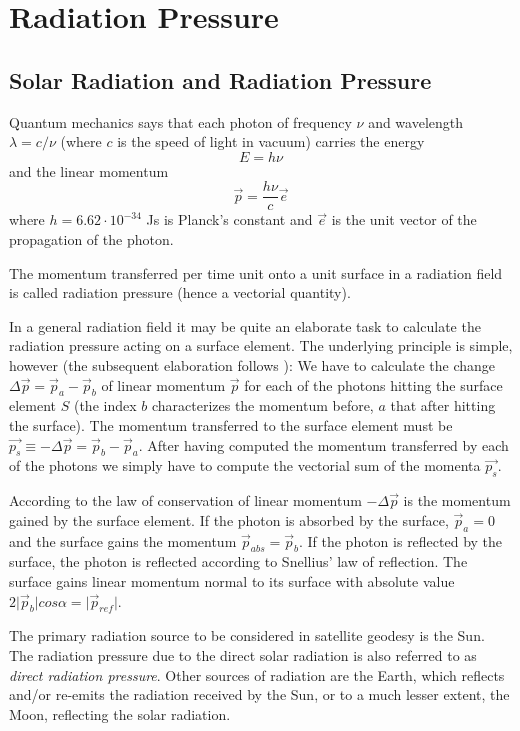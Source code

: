 \section{Radiation Pressure}
\subsection{Solar Radiation and Radiation Pressure}
Quantum mechanics says that each photon of frequency \(\nu\) and wavelength
\(\lambda = c / \nu\) (where \(c\) is the speed of light in vacuum) carries the energy
\begin{equation}
    E = h \nu
\end{equation}
and the linear momentum
\begin{equation}
    \vec{p} = \frac{h \nu}{c} \vec{e}
\end{equation}
where \(h=6.62\cdot10^{-34}\) Js is Planck's constant and \(\vec{e}\) is the unit 
vector of the propagation of the photon.

The momentum transferred per time unit onto a unit surface in a radiation
ﬁeld is called radiation pressure (hence a vectorial quantity).

In a general radiation ﬁeld it may be quite an elaborate task to calculate
the radiation pressure acting on a surface element. The underlying principle
is simple, however (the subsequent elaboration follows \cite{BeutlerVII}): 
We have to calculate the change \(\Delta \vec{p} = \vec{p}_a -\vec{p}_b\) of 
linear momentum \(\vec{p}\) for each of the photons hitting the surface element 
\(S\) (the index \(b\) characterizes the momentum before, \(a\) that after hitting the surface).
The momentum transferred to the surface element must be 
\(\vec{p_s} \equiv - \Delta \vec{p} = \vec{p}_b -\vec{p}_a \).
After having computed the momentum transferred by each of the photons
we simply have to compute the vectorial sum of the momenta \(\vec{p_s}\).

According to the law of conservation of linear momentum \(-\Delta \vec{p}\) is 
the momentum gained by the surface element. If the photon is absorbed by the surface, 
\(\vec{p}_a = 0\) and the surface gains the momentum \({\vec{p}}_{abs} = \vec{p}_b\).
If the photon is reﬂected by the surface, the photon is reﬂected according to Snellius' law
of reﬂection. The surface gains linear momentum normal to its surface with
absolute value \(2 \lvert \vec{p}_b \rvert cos\alpha = \lvert {\vec{p}}_{ref} \rvert\).

The primary radiation source to be considered in satellite geodesy is the
Sun. The radiation pressure due to the direct solar radiation is also referred
to as \emph{direct radiation pressure}. Other sources of radiation are the Earth, which
reﬂects and/or re-emits the radiation received by the Sun, or to a much lesser
extent, the Moon, reﬂecting the solar radiation.

